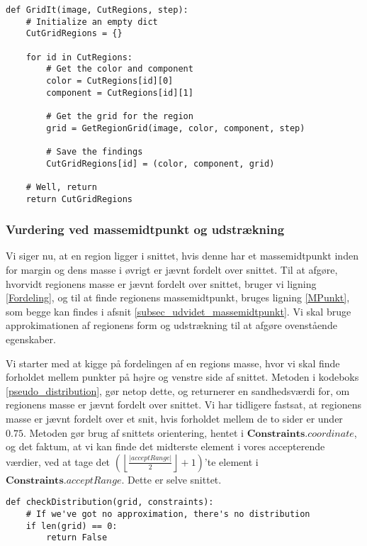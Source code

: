 {\begin{lstlisting}[caption={Metode, som finder approksimationen til alle
    regioner i en instans af $\angles{CutRegions}$.}, captionpos=b,
    label={pseudo_GridIt}, frame=tb,
    breaklines=false, float=t]
def GridIt(image, CutRegions, step):
    # Initialize an empty dict
    CutGridRegions = {}

    for id in CutRegions:
        # Get the color and component
        color = CutRegions[id][0]
        component = CutRegions[id][1]

        # Get the grid for the region
        grid = GetRegionGrid(image, color, component, step)

        # Save the findings
        CutGridRegions[id] = (color, component, grid)

    # Well, return
    return CutGridRegions
\end{lstlisting}

\subsubsection{Vurdering ved massemidtpunkt og udstrækning}
Vi siger nu, at en region ligger i snittet, hvis denne har et
massemidtpunkt inden for margin og dens masse i øvrigt er jævnt fordelt
over snittet. Til at afgøre, hvorvidt regionens masse er jævnt fordelt
over snittet, bruger vi ligning \eqref{Fordeling}, og til at finde
regionens massemidtpunkt, bruges ligning \eqref{MPunkt}, som begge kan
findes i afsnit \ref{subsec_udvidet_massemidtpunkt}. Vi skal bruge
approkimationen af regionens form og udstrækning til at afgøre
ovenstående egenskaber.

Vi starter med at kigge på fordelingen af en regions masse, hvor vi skal
finde forholdet mellem punkter på højre og venstre side af snittet.
Metoden i kodeboks \ref{pseudo_distribution}, gør netop dette, og
returnerer en sandhedsværdi for, om regionens masse er jævnt fordelt
over snittet. Vi har tidligere fastsat, at regionens masse er jævnt
fordelt over et snit, hvis forholdet mellem de to sider er under $0.75$.
Metoden gør brug af snittets orientering, hentet i
$\textbf{Constraints}.\textit{coordinate}$, og det faktum, at vi kan
finde det midterste element i vores accepterende værdier, ved at tage
det $\left(\left\lfloor \frac{|\textit{acceptRange}|}{2}\right\rfloor +
1\right)$'te element i $\textbf{Constraints}.\textit{acceptRange}$.
Dette er selve snittet.

\begin{lstlisting}[caption={Metode som, på baggrund af regionens
    fordeling af masse, afgør, om denne region er jævnt fordelt},
    captionpos=b, label={pseudo_distribution}, frame=tb,
    breaklines=false, float=t]
def checkDistribution(grid, constraints):
    # If we've got no approximation, there's no distribution
    if len(grid) == 0:
        return False


\end{lstlisting}}
